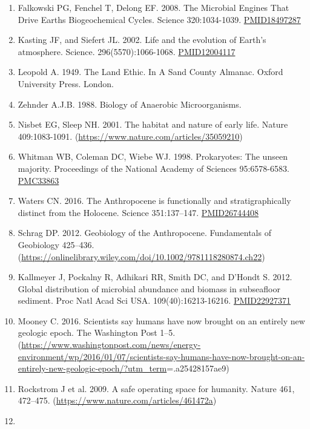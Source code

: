 \documentclass[]{article}
\begin{document}
\begin{enumerate}
\def\labelenumi{\arabic{enumi}.}
\item
  Falkowski PG, Fenchel T, Delong EF. 2008. The Microbial Engines That
  Drive Earths Biogeochemical Cycles. Science 320:1034-1039.
  \href{http://science.sciencemag.org/content/320/5879/1034.long}{PMID18497287}
\item
  Kasting JF, and Siefert JL. 2002. Life and the evolution of Earth's
  atmosphere. Science. 296(5570):1066-1068.
  \href{https://www.ncbi.nlm.nih.gov/pubmed/12004117}{PMID12004117}
\item
  Leopold A. 1949. The Land Ethic. In A Sand County Almanac. Oxford
  University Press. London.
\item
  Zehnder A.J.B. 1988. Biology of Anaerobic Microorganisms.
\item
  Nisbet EG, Sleep NH. 2001. The habitat and nature of early life.
  Nature 409:1083-1091. (\url{https://www.nature.com/articles/35059210})
\item
  Whitman WB, Coleman DC, Wiebe WJ. 1998. Prokaryotes: The unseen
  majority. Proceedings of the National Academy of Sciences
  95:6578-6583.
  \href{https://www.ncbi.nlm.nih.gov/pmc/articles/PMC33863/}{PMC33863}
\item
  Waters CN. 2016. The Anthropocene is functionally and
  stratigraphically distinct from the Holocene. Science 351:137--147.
  \href{https://www.ncbi.nlm.nih.gov/pubmed/26744408}{PMID26744408}
\item
  Schrag DP. 2012. Geobiology of the Anthropocene. Fundamentals of
  Geobiology 425--436.
  (\url{https://onlinelibrary.wiley.com/doi/10.1002/9781118280874.ch22})
\item
  Kallmeyer J, Pockalny R, Adhikari RR, Smith DC, and D'Hondt S. 2012.
  Global distribution of microbial abundance and biomass in subseafloor
  sediment. Proc Natl Acad Sci USA. 109(40):16213-16216.
  \href{https://www.ncbi.nlm.nih.gov/pubmed/22927371}{PMID22927371}
\item
  Mooney C. 2016. Scientists say humans have now brought on an entirely
  new geologic epoch. The Washington Post 1--5.
  (\url{https://www.washingtonpost.com/news/energy-environment/wp/2016/01/07/scientists-say-humans-have-now-brought-on-an-entirely-new-geologic-epoch/?utm_term}=.a25428157ae9)
\item
  Rockstrom J et al. 2009. A safe operating space for humanity. Nature
  461, 472--475. (\url{https://www.nature.com/articles/461472a})
\item

\end{enumerate}
\end{document}
